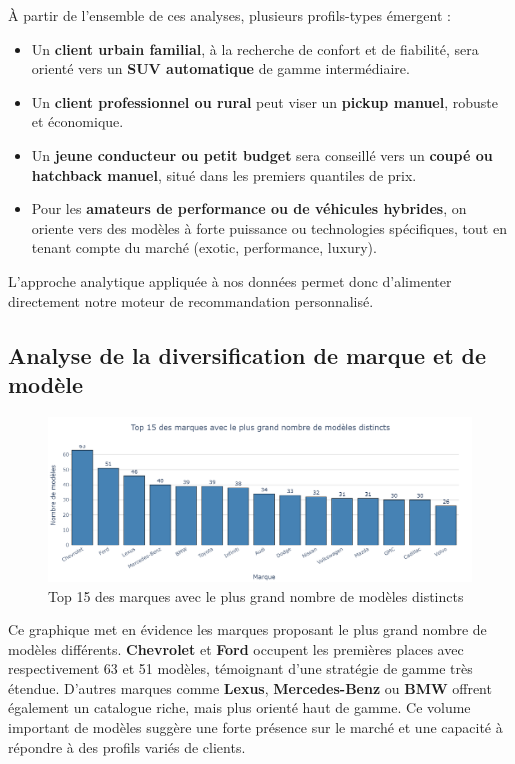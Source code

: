 \documentclass[12pt]{report}
\begin{document}
À partir de l’ensemble de ces analyses, plusieurs profils-types émergent :
\begin{itemize}
  \item Un \textbf{client urbain familial}, à la recherche de confort et de fiabilité, sera orienté vers un \textbf{SUV automatique} de gamme intermédiaire.
  \item Un \textbf{client professionnel ou rural} peut viser un \textbf{pickup manuel}, robuste et économique.
  \item Un \textbf{jeune conducteur ou petit budget} sera conseillé vers un \textbf{coupé ou hatchback manuel}, situé dans les premiers quantiles de prix.
  \item Pour les \textbf{amateurs de performance ou de véhicules hybrides}, on oriente vers des modèles à forte puissance ou technologies spécifiques, tout en tenant compte du marché (exotic, performance, luxury).
\end{itemize}

L’approche analytique appliquée à nos données permet donc d’alimenter directement notre moteur de recommandation personnalisé.


\subsection{Analyse de la diversification de marque et de modèle}
\begin{figure}[H]
    \centering
    \includegraphics[width=1\textwidth]{Modele_marque.png}
    \caption{Top 15 des marques avec le plus grand nombre de modèles distincts}
    \label{fig:modele-marque}
\end{figure}

Ce graphique met en évidence les marques proposant le plus grand nombre de modèles différents. \textbf{Chevrolet} et \textbf{Ford} occupent les premières places avec respectivement 63 et 51 modèles, témoignant d’une stratégie de gamme très étendue. D’autres marques comme \textbf{Lexus}, \textbf{Mercedes-Benz} ou \textbf{BMW} offrent également un catalogue riche, mais plus orienté haut de gamme. Ce volume important de modèles suggère une forte présence sur le marché et une capacité à répondre à des profils variés de clients.
\end{document}
